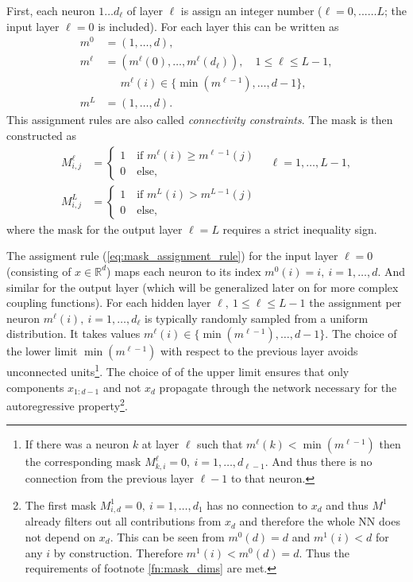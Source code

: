\documentclass[12pt,a4paper]{article}
\begin{document}
 First, each neuron $1\dots d_\ell$ of layer $\ell$ is assign an integer number ($\ell=0, ...\dots L$; the input layer $\ell=0$ is included). For each layer   this can be written as
\begin{align} \label{eq:mask_assignment_rule}
 m^0  &= (1, \dots, d), \nonumber \\
 m^\ell &= (m^\ell(0), \dots, m^\ell(d_\ell)), \quad 1 \leq \ell \leq L-1, \nonumber\\ 
 &\quad ~~ m^\ell(i) \in \{\min(m^{\ell-1}),\dots, d-1\}, \nonumber \\  
m^L &= (1, \dots, d).
 \end{align}
This assignment rules are also called \textit{connectivity constraints}. The mask is then constructed as
\begin{align}\label{eq:mask_construction_rule}
 	M^\ell_{i,j} &= \begin{cases}
 	1 \quad  \text{if } m^{\ell}(i) \geq m^{\ell-1}(j)\\ 
 	0 \quad  \text{else}, 
 	\end{cases}\quad \ell=1,\dots, L-1, \nonumber\\
 	M^L_{i,j} &= \begin{cases}
 	1 \quad  \text{if } m^{L}(i) > m^{L-1}(j) \\ 
 	0 \quad  \text{else,} 
 	\end{cases}
\end{align}
where the mask for the output layer $\ell=L$ requires a strict inequality sign.

The assigment rule (\ref{eq:mask_assignment_rule})
for the input layer $\ell=0$ (consisting of $x\in \mathbb{R}^d$) maps each neuron to its index $m^0(i) = i, ~ i=1,\dots,d$. And similar for the output layer (which will be generalized later on for more complex coupling functions).
For each hidden layer $\ell, ~1 \leq \ell \leq L-1$ the assignment per neuron  $m^\ell(i), ~ i=1,\dots, d_\ell$ is typically randomly sampled from a uniform distribution. It takes values $m^\ell(i) \in \{\min(m^{\ell-1}),\dots, d-1\}$. The choice of the lower limit $\min(m^{\ell-1})$ with respect to the previous layer avoids unconnected units\footnote{If there was a neuron $k$ at layer $\ell$ such that $m^\ell(k) < \min(m^{\ell-1})$ then the corresponding mask $M^\ell_{k,i} = 0, ~ i = 1, \dots, d_{\ell-1}$. And thus there is no connection from the previous layer $\ell-1$ to that neuron.}. The choice of of the upper limit ensures that only components $x_{1:d-1}$ and not $x_d$ propagate through the network necessary for the autoregressive property\footnote{The first mask $M^1_{i,d} = 0, ~i=1,\dots,d_1$ has no connection to $x_d$ and thus $M^1$ already filters out all contributions from $x_d$ and therefore the whole NN does not depend on $x_d$. This can be seen from  $m^0(d) = d$ and $m^1(i) < d$ for any $i$ by construction. Therefore $m^1(i) < m^0(d) = d$. Thus the requirements of footnote \ref{fn:mask_dims} are met.}.
\end{document}

